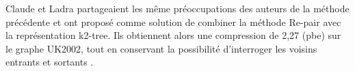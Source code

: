 
Claude et Ladra \citep{claude2011practical} partageaient les même préoccupations des auteurs de la méthode précédente et ont proposé comme solution de combiner la méthode Re-pair avec la représentation k2-tree. Ils obtiennent alors une compression de 2,27 (pbe) sur le graphe UK2002, tout en conservant la possibilité d'interroger les voisins entrants et sortants \citep{maneth2015survey}.